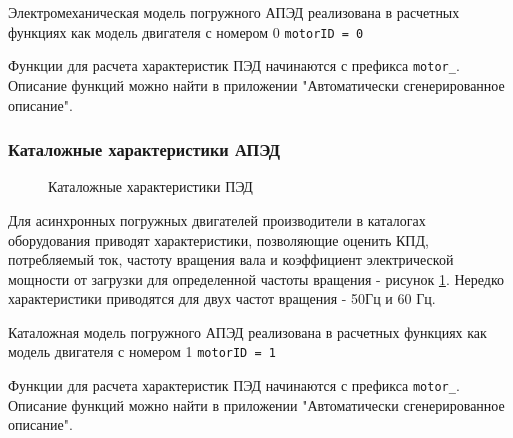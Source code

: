 Электромеханическая модель погружного АПЭД реализована в расчетных функциях \unf{} как модель двигателя с номером 0  \texttt{motorID = 0}

Функции для расчета характеристик ПЭД начинаются с префикса \texttt{motor_}. Описание функций можно найти в приложении "Автоматически сгенерированное описание".

\subsubsection{Каталожные характеристики АПЭД}

\begin{figure}[h!]
	\caption{Каталожные характеристики ПЭД}
	\label{ris:novomet_motor_1}
\end{figure}

Для асинхронных погружных двигателей производители в каталогах оборудования приводят характеристики, позволяющие оценить КПД, потребляемый ток, частоту вращения вала и коэффициент электрической мощности от загрузки для определенной частоты вращения - рисунок \ref{ris:novomet_motor_1}. Нередко характеристики приводятся для двух частот вращения - 50Гц и 60 Гц.


Каталожная модель погружного АПЭД реализована в расчетных функциях \unf как модель двигателя с номером 1  \texttt{motorID = 1}

Функции для расчета характеристик ПЭД начинаются с префикса \texttt{motor_}. Описание функций можно найти в приложении "Автоматически сгенерированное описание".



\newpage

